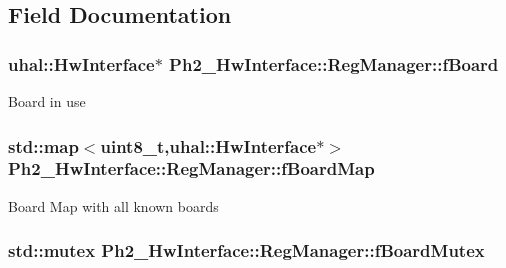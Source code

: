 \subsection{Field Documentation}
\hypertarget{class_ph2___hw_interface_1_1_reg_manager_a0d4908ec834a3a0b7d8139872fd0a4a0}{
\subsubsection[{f\-Board}]{\setlength{\rightskip}{0pt plus 5cm}uhal\-::\-Hw\-Interface$\ast$ Ph2\-\_\-\-Hw\-Interface\-::\-Reg\-Manager\-::f\-Board\hspace{0.3cm}{\ttfamily [protected]}}}\label{class_ph2___hw_interface_1_1_reg_manager_a0d4908ec834a3a0b7d8139872fd0a4a0}
Board in use \hypertarget{class_ph2___hw_interface_1_1_reg_manager_a9c34ffe467a572796c05036533bb6d39}{
\subsubsection[{f\-Board\-Map}]{\setlength{\rightskip}{0pt plus 5cm}std\-::map$<$uint8\-\_\-t,uhal\-::\-Hw\-Interface$\ast$$>$ Ph2\-\_\-\-Hw\-Interface\-::\-Reg\-Manager\-::f\-Board\-Map\hspace{0.3cm}{\ttfamily [protected]}}}\label{class_ph2___hw_interface_1_1_reg_manager_a9c34ffe467a572796c05036533bb6d39}
Board Map with all known boards \hypertarget{class_ph2___hw_interface_1_1_reg_manager_ab5fdbe722820897d3a1344f300cc4a92}{
\subsubsection[{f\-Board\-Mutex}]{\setlength{\rightskip}{0pt plus 5cm}std\-::mutex Ph2\-\_\-\-Hw\-Interface\-::\-Reg\-Manager\-::f\-Board\-Mutex\hspace{0.3cm}{\ttfamily [protected]}}}\label{class_ph2___hw_interface_1_1_reg_manager_ab5fdbe722820897d3a1344f300cc4a92}
